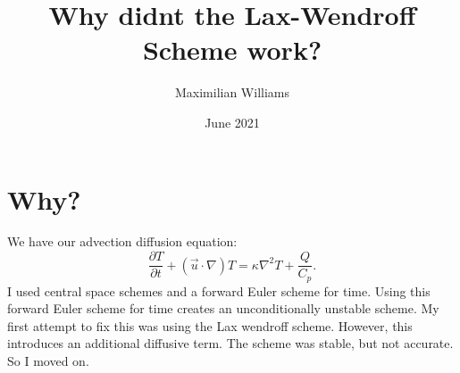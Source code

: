 \documentclass{article}
\title{Why didnt the Lax-Wendroff Scheme work?}
\author{Maximilian Williams}
\date{June 2021}
\begin{document}
\maketitle

\section*{Why?}
We have our advection diffusion equation:
\begin{equation}
	\frac{\partial T}{\partial t} + (\vec{u} \cdot \nabla) T = \kappa \nabla^2 T + \frac{Q}{C_p}.
\end{equation}
I used central space schemes and a forward Euler scheme for time. Using this forward Euler scheme for time creates an unconditionally unstable scheme.
\newline
My first attempt to fix this was using the Lax wendroff scheme. However, this introduces an additional diffusive term. The scheme was stable, but not accurate. So I moved on.
\newline
\end{document}
